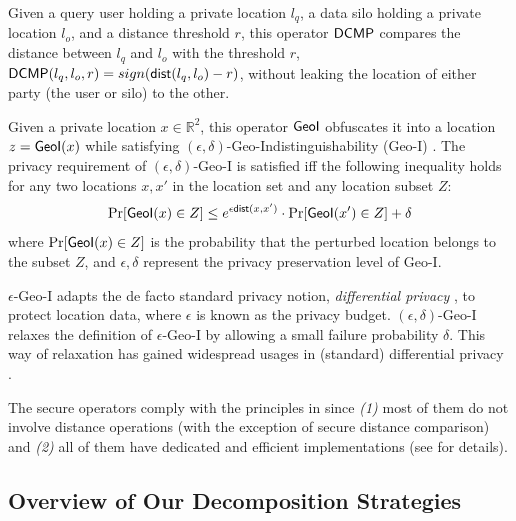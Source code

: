 \begin{definition}
\label{def:sdcmp}
Given a query user holding a private location $l_q$, a data silo holding a private location $l_o$, and a distance threshold $r$,
this operator $\textsf{DCMP}$ compares the distance between $l_q$ and $l_o$ with the threshold $r$,
\ie $\textsf{DCMP}(l_q,l_o,r) = sign(\textsf{dist}(l_q,l_o)-r)$, 
without leaking the location of either party (\ie the user or silo) to the other.
\end{definition}

\begin{definition}
\label{def:sdp}
Given a private location $x \in \mathbb{R}^2$, this operator $\textsf{GeoI}$ obfuscates it into a location $z = \textsf{GeoI}(x)$ 
while satisfying $(\epsilon,\delta)$-Geo-Indistinguishability (Geo-I) \cite{DBLP:journals/corr/abs-2312-12012}.
The privacy requirement of $(\epsilon,\delta)$-Geo-I is satisfied iff the following inequality holds for any two locations $x, x'$ in the location set and any location subset $Z$:
\begin{equation}
    \mathrm{Pr}[\textsf{GeoI}(x)\in Z] \le e^{\epsilon \textsf{dist}(x,x')} \cdot \mathrm{Pr}[\textsf{GeoI}(x')\in Z] + \delta
\end{equation}
where $\mathrm{Pr}[\textsf{GeoI}(x)\in Z]$ is the probability that the perturbed location belongs to the subset $Z$,
and $\epsilon,\delta$ represent the privacy preservation level of Geo-I.
\end{definition}

$\epsilon$-Geo-I \cite{DBLP:conf/ccs/AndresBCP13} adapts the de facto standard privacy notion, \textit{differential privacy} \cite{DBLP:series/synthesis/2016Li}, to protect location data, where $\epsilon$ is known as the privacy budget.
$(\epsilon,\delta)$-Geo-I relaxes the definition of $\epsilon$-Geo-I by allowing a small failure probability $\delta$. This way of relaxation has gained widespread usages in (standard) differential privacy \cite{DBLP:series/synthesis/2016Li}.

The secure operators comply with the principles in  since \textit{(1)} most of them do not involve distance operations (with the exception of secure distance comparison) and \textit{(2)} all of them have dedicated and efficient implementations (see  for details).

\subsection{Overview of Our Decomposition Strategies}
\label{sec:rewriter-framework}

